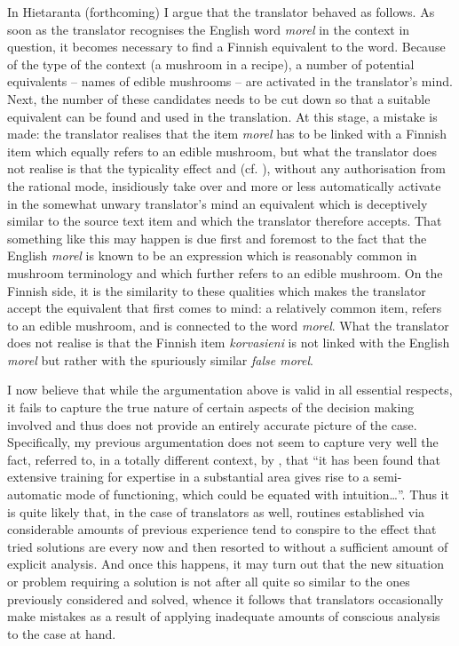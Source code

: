 \documentclass[output=paper]{LSP/langsci}
\begin{document}
  In Hietaranta (forthcoming) I argue that the translator behaved as follows. As soon as the translator recognises the English word \textit{morel} in the context in question, it becomes necessary to find a Finnish equivalent to the word. Because of the type of the context (a mushroom in a recipe), a number of potential equivalents -- names of edible mushrooms -- are activated in the translator's mind. Next, the number of these candidates needs to be cut down so that a suitable equivalent can be found and used in the translation. At this stage, a mistake is made: the translator realises that the item \textit{morel} has to be linked with a Finnish item which equally refers to an edible mushroom, but what the translator does not realise is that the typicality effect and  (cf. \citealt[169, 260]{Evans2007}), without any authorisation from the rational mode, insidiously take over and more or less automatically activate in the somewhat unwary translator's mind an equivalent which is deceptively similar to the source text item and which the translator therefore accepts. That something like this may happen is due first and foremost to the fact that the English \textit{morel} is known to be an expression which is reasonably common in mushroom terminology and which further refers to an edible mushroom. On the Finnish side, it is the similarity to these qualities which makes the translator accept the equivalent that first comes to mind: a relatively common item, refers to an edible mushroom, and is connected to the word \textit{morel}. What the translator does not realise is that the Finnish item \textit{korvasieni} is not linked with the English \textit{morel} but rather with the spuriously similar \textit{false morel}.

  
  I now believe that while the argumentation above is valid in all essential respects, it fails to capture the true nature of certain aspects of the decision making involved and thus does not provide an entirely accurate picture of the case. Specifically, my previous argumentation does not seem to capture very well the fact, referred to, in a totally different context, by \citet[18]{Sjoberg2003}, that ``it has been found that extensive training for expertise in a substantial area gives rise to a semi-automatic mode of functioning, which could be equated with intuition\ldots ''. Thus it is quite likely that, in the case of translators as well, routines established via considerable amounts of previous experience tend to conspire to the effect that tried solutions are every now and then resorted to without a sufficient amount of explicit analysis. And once this happens, it may turn out that the new situation or problem requiring a solution is not after all quite so similar to the ones previously considered and solved, whence it follows that translators occasionally make mistakes as a result of applying inadequate amounts of conscious analysis to the case at hand.
\end{document}
